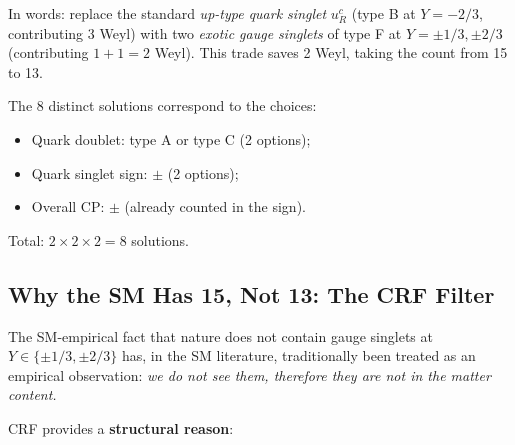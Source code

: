 \documentclass[12pt, a4paper]{article}
\begin{document}
In words: replace the standard \emph{up-type quark singlet} $u_R^c$
(type B at $Y = -2/3$, contributing 3 Weyl) with two \emph{exotic
gauge singlets} of type F at $Y = \pm 1/3, \pm 2/3$ (contributing
$1 + 1 = 2$ Weyl). This trade saves 2 Weyl, taking the count from
15 to 13.

The 8 distinct solutions correspond to the choices:
\begin{itemize}[leftmargin=*, noitemsep]
  \item Quark doublet: type A or type C (2 options);
  \item Quark singlet sign: $\pm$ (2 options);
  \item Overall CP: $\pm$ (already counted in the sign).
\end{itemize}
Total: $2 \times 2 \times 2 = 8$ solutions.

\subsection{Why the SM Has 15, Not 13: The CRF Filter}
\label{ssec:CRF-filter}

The SM-empirical fact that nature does not contain gauge singlets at
$Y \in \{\pm 1/3, \pm 2/3\}$ has, in the SM literature, traditionally
been treated as an empirical observation: \emph{we do not see them,
therefore they are not in the matter content.}

CRF provides a \textbf{structural reason}:
\end{document}
